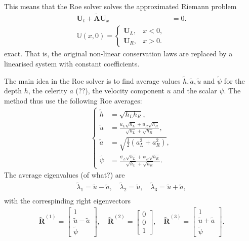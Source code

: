 This means that the Roe solver solves the approximated Riemann problem
\begin{align*}
    \mathbf{U}_t + \mathbf{\tilde{A}} \mathbf{U}_x &= 0. \\
    \mathbb{U}(x,0) = \begin{cases}
        \mathbf{U}_L, & x < 0, \\
        \mathbf{U}_R, & x > 0.
    \end{cases}
\end{align*}
exact.
That is, the original non-linear conservation laws are replaced by a linearised system with constant coefficients.

The main idea in the Roe solver is to find average values $\tilde{h}, \tilde{a}, \tilde{u}$ and $\tilde{\psi}$ for the depth $h$, the celerity $a$ (??), the velocity component $u$ and the scalar $\psi$.
The method thus use the following Roe averages:
\begin{align}\label{eq:Roe_averages}
    \left\{
\begin{aligned}
    \tilde{h} &= \sqrt{h_L h_R}, \\
    \tilde{u} &= \frac{u_L \sqrt{h_L} + u_R \sqrt{h_R}}{\sqrt{h_L} + \sqrt{h_R}}, \\
    \tilde{a} &= \sqrt{\frac{1}{2}(a_L^2 + a_R^2)}, \\
    \tilde{\psi} &= \frac{\psi_L \sqrt{h_L}  + \psi_R \sqrt{h_R}}{\sqrt{h_L} + \sqrt{h_R}}.
\end{aligned}
\right.
\end{align}
The average eigenvalues (of what?) are
\begin{align*}
    \tilde{\lambda}_1 = \tilde{u} - \tilde{a}, \quad \tilde{\lambda}_2 = \tilde{u}, \quad \tilde{\lambda}_3 = \tilde{u} + \tilde{a}, \\
\end{align*} 
with the correspinding right eigenvectors
\begin{align*}
    \tilde{\mathbf{R}}^{(1)} = \begin{bmatrix}
        1 \\ \tilde{u} - \tilde{a} \\ \tilde{\psi}
    \end{bmatrix}, \quad
    \tilde{\mathbf{R}}^{(2)} = \begin{bmatrix}
        0 \\ 0 \\  1
    \end{bmatrix}, \quad
    \tilde{\mathbf{R}}^{(3)} = \begin{bmatrix}
        1 \\ \tilde{u} + \tilde{a} \\ \tilde{\psi}
    \end{bmatrix}.
\end{align*}
